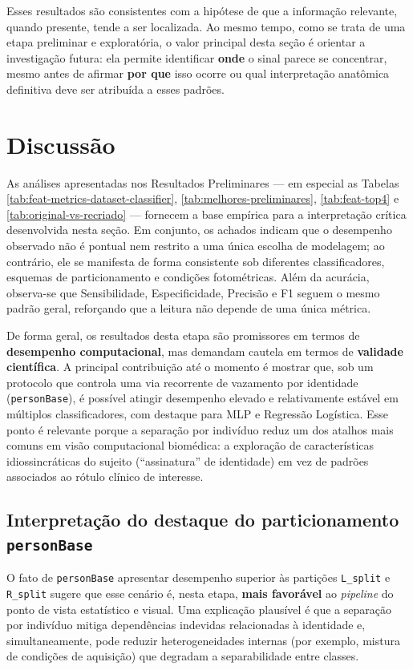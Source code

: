 \documentclass[12pt,a4paper]{article}
\begin{document}
Esses resultados são consistentes com a hipótese de que a informação relevante, quando presente, tende a ser localizada. Ao mesmo tempo, como se trata de uma etapa preliminar e exploratória, o valor principal desta seção é orientar a investigação futura: ela permite identificar \textbf{onde} o sinal parece se concentrar, mesmo antes de afirmar \textbf{por que} isso ocorre ou qual interpretação anatômica definitiva deve ser atribuída a esses padrões.

\section{Discussão}

As análises apresentadas nos Resultados Preliminares --- em especial as Tabelas
\ref{tab:feat-metrics-dataset-classifier}, \ref{tab:melhores-preliminares},
\ref{tab:feat-top4} e \ref{tab:original-vs-recriado} --- fornecem a base empírica
para a interpretação crítica desenvolvida nesta seção. Em conjunto, os achados
indicam que o desempenho observado não é pontual nem restrito a uma única escolha
de modelagem; ao contrário, ele se manifesta de forma consistente sob diferentes
classificadores, esquemas de particionamento e condições fotométricas. Além da
acurácia, observa-se que Sensibilidade, Especificidade, Precisão e F1 seguem o
mesmo padrão geral, reforçando que a leitura não depende de uma única métrica.

De forma geral, os resultados desta etapa são promissores em termos de
\textbf{desempenho computacional}, mas demandam cautela em termos de
\textbf{validade científica}. A principal contribuição até o momento é mostrar
que, sob um protocolo que controla uma via recorrente de vazamento por identidade
(\texttt{personBase}), é possível atingir desempenho elevado e relativamente estável
em múltiplos classificadores, com destaque para MLP e Regressão Logística. Esse
ponto é relevante porque a separação por indivíduo reduz um dos atalhos mais
comuns em visão computacional biomédica: a exploração de características
idiossincráticas do sujeito (``assinatura'' de identidade) em vez de padrões
associados ao rótulo clínico de interesse.

\subsection{Interpretação do destaque do particionamento \texttt{personBase}}
O fato de \texttt{personBase} apresentar desempenho superior às partições \texttt{L\_split} e \texttt{R\_split} sugere que esse cenário é,
nesta etapa, \textbf{mais favorável} ao \textit{pipeline} do ponto de vista
estatístico e visual. Uma explicação plausível é que a separação por indivíduo
mitiga dependências indevidas relacionadas à identidade e, simultaneamente,
pode reduzir heterogeneidades internas (por exemplo, mistura de condições de
aquisição) que degradam a separabilidade entre classes.
\end{document}
